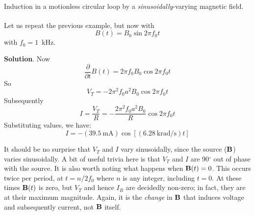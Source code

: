 ~\\ \begin{example} 
\begin{mdframed}[backgroundcolor=brown!20,linecolor=brown!20]\raggedright
Induction in a motionless circular loop by a \emph{sinusoidally}-varying magnetic field.
\\~\\
Let us repeat the previous example, but now with 
%
\begin{equation}
B(t) = B_0\sin{2\pi f_0 t}
\nonumber
\end{equation}
%
with $f_0=1$~kHz.

{\bf Solution}. 
Now
%
\begin{equation}   
\frac{\partial}{\partial t}B(t) = 2\pi f_0 B_0\cos{2\pi f_0 t}
\nonumber
\end{equation}
%
So
%
\begin{equation}  
V_T =  -2\pi^2 f_0 a^2 B_0  \cos{2\pi f_0 t}
\nonumber
\end{equation}
%
Subsequently
%
\begin{equation}   
I = \frac{V_T}{R} = -\frac{2\pi^2 f_0 a^2 B_0 }{R} \cos{2\pi f_0 t} 
\nonumber
\end{equation}
%
Substituting values, we have:
%
\begin{equation}   
I = -(39.5~\mbox{mA}) \cos{ \left[ (6.28~\mbox{krad/s}) t \right] } 
\nonumber
\end{equation}

It should be no surprise that $V_T$ and $I$ vary sinusoidally, since the source (${\bf B}$) varies sinusoidally.
A bit of useful trivia here is that $V_T$ and $I$ are 90$^{\circ}$ out of phase with the source.
It is also worth noting what happens when ${\bf B}(t)=0$.
This occurs twice per period, at $t=n/2f_0$ where $n$ is any integer, including $t=0$. 
At these times ${\bf B}(t)$ is zero, but $V_T$ and hence $I_R$ are decidedly non-zero; in fact, they are at their maximum magnitude.  
Again, it is the {\it change} in ${\bf B}$ that induces voltage and subsequently current, not ${\bf B}$ itself.



\end{mdframed}
\end{example}
